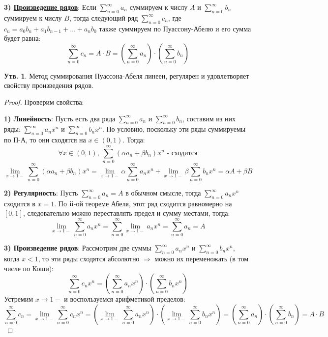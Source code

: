\documentclass[12pt]{article}
\newcommand{\RN}[1]{%
	\textup{\uppercase\expandafter{\romannumeral#1}}%
}
\theoremstyle{definition}
\newtheorem{prop}{Утв.}
\newcommand{\ddsum}[2]{\displaystyle\sum\limits_{#1}^{#2}}
\begin{document}
\textbf{3) \uline{Произведение рядов}}: Если $\ddsum{n = 0}{\infty}a_n$ суммируем к числу $A$ и $\ddsum{n = 0}{\infty}b_n$ суммируем к числу $B$, тогда следующий ряд $\ddsum{n = 0}{\infty}c_n$, где $c_n = a_0b_n + a_1 b_{n-1} + \dotsc + a_n b_0$ также суммируем по Пуассону-Абелю и его сумма будет равна:
$$
	\ddsum{n = 0}{\infty}c_n = A{\cdot}B = \left(\ddsum{n = 0}{\infty}a_n\right){\cdot}\left(\ddsum{n = 0}{\infty}b_n\right)
$$

\begin{prop}
	Метод суммирования Пуассона-Абеля линеен, регулярен и удовлетворяет свойству произведения рядов. 
\end{prop}
\begin{proof}
	Проверим свойства:
	
	\textbf{1) Линейность}: Пусть есть два ряда $\ddsum{n = 0}{\infty}a_n$ и $\ddsum{n = 0}{\infty}b_n$, составим из них ряды: $\ddsum{n = 0}{\infty}a_nx^n$ и $\ddsum{n = 0}{\infty}b_nx^n$. По условию, поскольку эти ряды суммируемы по П-А, то они сходятся на $x \in (0,1)$. Тогда: 
	$$
		\forall x \in (0,1), \, \ddsum{n = 0}{\infty}(\alpha a_n + \beta b_n)x^n \text{ - сходится}
	$$
	$$
		\lim\limits_{x \to 1-}\ddsum{n = 0}{\infty}(\alpha a_n + \beta b_n)x^n = \lim\limits_{x \to 1-}\alpha \ddsum{n = 0}{\infty}a_n x^n + \lim\limits_{x \to 1-}\beta \ddsum{n = 0}{\infty}b_n x ^n = \alpha A + \beta B
	$$
	
	\textbf{2) Регулярность}: Пусть $\ddsum{n = 0}{\infty}a_n = A$ в обычном смысле, тогда $\ddsum{n = 0}{\infty}a_n x^n$ сходится в $x = 1$. По $\RN{2}$-ой теореме Абеля, этот ряд сходится равномерно на $[0,1]$, следовательно можно переставлять предел и сумму местами, тогда:
	$$
		\lim\limits_{x \to 1-}\ddsum{n = 0}{\infty}a_nx^n = \ddsum{n = 0}{\infty}\lim\limits_{x \to 1-}a_n x^n = \ddsum{n = 0}{\infty}a_n = A
	$$
	
	\textbf{3) Произведение рядов}: Рассмотрим две суммы $\ddsum{n = 0}{\infty}a_n x^n$ и $\ddsum{n = 0}{\infty}b_n x^n$, когда $x < 1$, то эти ряды сходятся абсолютно $\Rightarrow$ можно их переменожать (в том числе по Коши):
	$$
		\ddsum{n = 0}{\infty}c_n x^n = \left(\ddsum{n = 0}{\infty}a_n x^n\right){\cdot}\left(\ddsum{n = 0}{\infty}b_n x^n\right)
	$$
	Устремим $x \to 1-$ и воспользуемся арифметикой пределов:
	$$
		\ddsum{n = 0}{\infty}c_n = \lim\limits_{x \to 1-} \ddsum{n = 0}{\infty}c_n x^n = \left(\lim\limits_{x \to 1-}\ddsum{n = 0}{\infty}a_nx^n\right){\cdot}\left(\lim\limits_{x \to 1-}\ddsum{n = 0}{\infty}b_nx^n\right) = \left(\ddsum{n = 0}{\infty}a_n\right){\cdot}\left(\ddsum{n = 0}{\infty}b_n\right) = A{\cdot}B
	$$
\end{proof}
\end{document}
